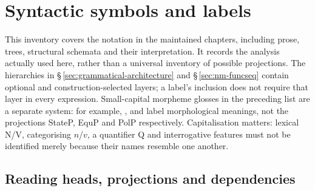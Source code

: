\section{Syntactic symbols and labels}\label{sec:syntax-symbols}

This inventory covers the notation in the maintained chapters, including
prose, trees, structural schemata and their interpretation. It records the
analysis actually used here, rather than a universal inventory of possible
projections. The hierarchies in §\,\ref{sec:grammatical-architecture}
and §\,\ref{sec:nm-funcseq} contain optional and construction-selected layers;
a label's inclusion does not require that layer in every expression.
Small-capital morpheme glosses in the preceding list are a separate system:
for example, ,  and  label morphological meanings,
not the projections StateP, EquP and PolP respectively. Capitalisation matters:
lexical N/V, categorising $n$/$v$, a quantifier Q and interrogative features
must not be identified merely because their names resemble one another.

\subsection{Reading heads, projections and dependencies}
\label{sec:syntax-symbol-conventions}

